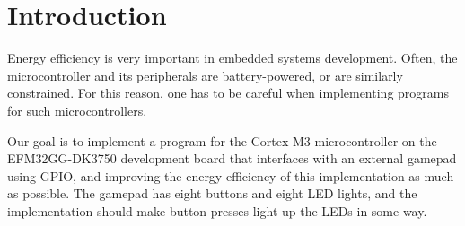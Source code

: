\chapter{Introduction}
Energy efficiency is very important in embedded systems development. Often, the microcontroller and its peripherals are battery-powered, or are similarly constrained. For this reason, one has to be careful when implementing programs for such microcontrollers. 

Our goal is to implement a program for the Cortex-M3 microcontroller on the EFM32GG-DK3750 development board that interfaces with an external gamepad using GPIO, and improving the energy efficiency of this implementation as much as possible. The gamepad has eight buttons and eight LED lights, and the implementation should make button presses light up the LEDs in some way.